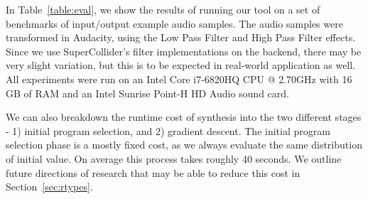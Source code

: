 In Table~\ref{table:eval}, we show the results of running our tool on a set of benchmarks of input/output example audio samples.
The audio samples were transformed in Audacity, using the Low Pass Filter and High Pass Filter effects.
Since we use SuperCollider's filter implementations on the backend, there may be very slight variation, but this is to be expected in real-world application as well.
All experiments were run on an Intel Core i7-6820HQ CPU @ 2.70GHz with 16 GB of RAM and an Intel Sunrise Point-H HD Audio sound card.


We can also breakdown the runtime cost of synthesis into the two different stages - 1) initial program selection, and 2) gradient descent.
The initial program selection phase is a mostly fixed cost, as we always evaluate the same distribution of initial value.
On average this process takes roughly 40 seconds.
We outline future directions of research that may be able to reduce this cost in Section~\ref{sec:rtypes}.
